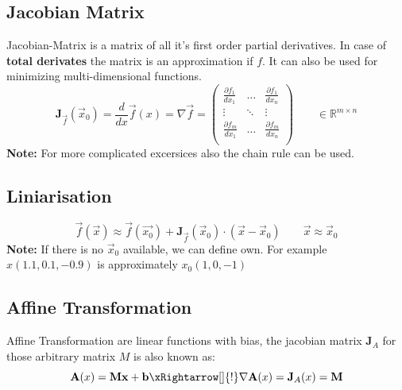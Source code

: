 \subsection{Jacobian Matrix}
Jacobian-Matrix is a matrix of all it's first order partial derivatives. In case of \textbf{total derivates} the matrix is an approximation if $f$. It can also be used for minimizing multi-dimensional functions.
\[
\mathbf{J}_{\vec{f}}(\vec{x}_0) = \frac{d}{dx}\vec{f}(x) = \nabla\vec{f} = \begin{pmatrix}
	\frac{\partial f_1}{dx_1} & \dots & \frac{\partial f_1}{dx_n} \\
	\vdots & \ddots & \vdots \\
	\frac{\partial f_m}{dx_1} & \dots & \frac{\partial f_m}{dx_n} \\
\end{pmatrix} \qquad \in \mathbb{R}^{m \times n}
\]
\noindent\textbf{Note:} For more complicated excersices also the chain rule can be used.

\subsection{Liniarisation}
\[
\vec{f}(\vec{x}) \approx \vec{f}(\vec{x_0}) + \mathbf{J}_{\vec{f}}(\vec{x}_0) \cdot (\vec{x} - \vec{x}_0)  \qquad \vec{x} \approx \vec{x}_0
\]
\textbf{Note:} If there is no $\vec{x}_0$ available, we can define own. For example $x(1.1, 0.1, -0.9)$ is approximately $x_0(1, 0, -1)$

\subsection{Affine Transformation}
Affine Transformation are linear functions with bias, the jacobian matrix $\mathbf{J}_A$ for those arbitrary matrix $M$ is also known as:
\[
\mathbf{A}(x) = \mathbf{M}\mathbf{x} + \mathbf{b} \xRightarrow[]{!} \nabla \mathbf{A}(x) =  \mathbf{J}_A(x) = \mathbf{M}
\]
